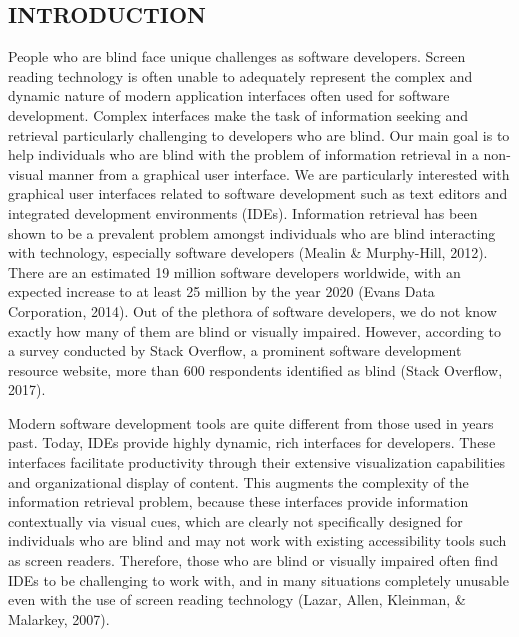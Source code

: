 \documentclass[11.5pt]{sig-alternate} %
\begin{document}
\begin{large}
\section*{INTRODUCTION}

People who are blind face unique challenges as software developers. Screen reading technology is often unable to adequately represent the complex and dynamic nature of modern application interfaces often used for software development. Complex interfaces make the task of information seeking and retrieval particularly challenging to developers who are blind. Our main goal is to help individuals who are blind with the problem of information retrieval in a non-visual manner from a graphical user interface. We are particularly interested with graphical user interfaces related to software development such as text editors and integrated development environments (IDEs). Information retrieval has been shown to be a prevalent problem amongst individuals who are blind interacting with technology, especially software developers (Mealin \& Murphy-Hill, 2012). There are an estimated 19 million software developers worldwide, with an expected increase to at least 25 million by the year 2020 (Evans Data Corporation, 2014). Out of the plethora of software developers, we do not know exactly how many of them are blind or visually impaired. However, according to a survey conducted by Stack Overflow, a prominent software development resource website, more than 600 respondents identified as blind (Stack Overflow, 2017).

Modern software development tools are quite different from those used in years past. Today, IDEs provide highly dynamic, rich interfaces for developers. These interfaces facilitate productivity through their extensive visualization capabilities and organizational display of content. This augments the complexity of the information retrieval problem, because these interfaces provide information contextually via visual cues, which are clearly not specifically designed for individuals who are blind and may not work with existing accessibility tools such as screen readers. Therefore, those who are blind or visually impaired often find IDEs to be challenging to work with, and in many situations completely unusable even with the use of screen reading technology (Lazar, Allen, Kleinman, \& Malarkey, 2007).


\end{large}
\end{document}
